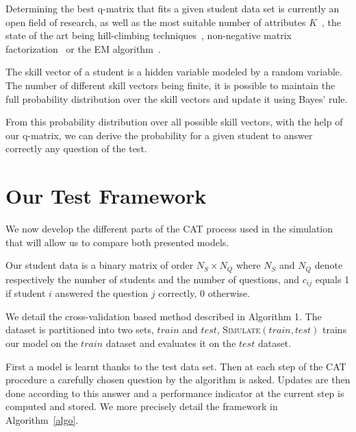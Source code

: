 \documentclass{sig-alternate}
\begin{document}
Determining the best q-matrix that fits a given student data set is currently an open field of research, as well as the most suitable number of attributes $K$~\citep{Huebner2010}, the state of the art being hill-climbing techniques~\citep{Barnes2005}, non-negative matrix factorization~\citep{Desmarais2011} or the EM algorithm~\citep{Huebner2010}. 

The skill vector of a student is a hidden variable modeled by a random variable. The number of different skill vectors being finite, it is possible to maintain the full probability distribution over the skill vectors and update it using Bayes' rule.

From this probability distribution over all possible skill vectors, with the help of our q-matrix, we can derive the probability for a given student to answer correctly any question of the test.



\section{Our Test Framework}

We now develop the different parts of the CAT process used in the simulation that will allow us to compare both presented models.

Our student data is a binary matrix of order $N_S \times N_Q$ where $N_S$ and $N_Q$ denote respectively the number of students and the number of questions, and $c_{ij}$ equals 1 if student $i$ answered the question $j$ correctly, 0 otherwise. 

We detail the cross-validation based method described in Algorithm 1. The dataset is partitioned into two sets, $train$ and $test$, \textsc{Simulate}$(train, test)$ trains our model on the $train$ dataset and evaluates it on the $test$ dataset.

First a model is learnt thanks to the test data set. Then at each step of the CAT procedure a carefully chosen question by the algorithm is asked. Updates are then done according to this answer and a performance indicator at the current step is computed and stored. We more precisely detail the framework in Algorithm~\ref{algo}.
\end{document}
